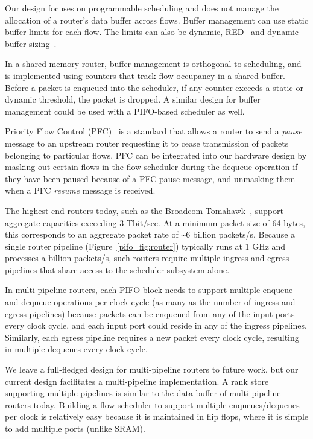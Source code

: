 Our design focuses on programmable scheduling and does not manage the
allocation of a router's data buffer across flows.  Buffer management can use
static buffer limits for each flow. The limits can also be dynamic, \eg
RED~\cite{red} and dynamic buffer sizing~\cite{broadcom_dynamic}.

In a shared-memory router, buffer management is orthogonal to scheduling,
and is implemented using counters that track flow occupancy in a shared
buffer. Before a packet is enqueued into the scheduler, if any counter
 exceeds a static or dynamic threshold, the packet is dropped. A similar
design for buffer management could be used with a PIFO-based scheduler as well.

Priority Flow Control (PFC)~\cite{pfc} is a standard that allows a router to
send a {\em pause} message to an upstream router requesting it to cease
transmission of packets belonging to particular flows. PFC can be integrated
into our hardware design by masking out certain flows in the flow scheduler
during the dequeue operation if they have been paused because of a PFC pause
message, and unmasking them when a PFC {\em resume} message is received.

The highest end routers today, such as the Broadcom Tomahawk~\cite{tomahawk},
support aggregate capacities exceeding 3 Tbit/sec. At a minimum packet size of
64 bytes, this corresponds to an aggregate packet rate of \textasciitilde6
billion packets/s. Because a single router pipeline
(Figure~\ref{pifo_fig:router}) typically runs at 1 GHz and processes a
billion packets/s, such routers require multiple ingress and egress pipelines
that share access to the scheduler subsystem alone.

In multi-pipeline routers, each PIFO block needs to support multiple enqueue
and dequeue operations per clock cycle (as many as the number of ingress and
egress pipelines) because packets can be enqueued from any of the input ports
every clock cycle, and each input port could reside in any of the ingress
pipelines. Similarly, each egress pipeline requires a new packet every clock
cycle, resulting in multiple dequeues every clock cycle.

We leave a full-fledged design for multi-pipeline routers to future work, but our
current design facilitates a multi-pipeline implementation. A rank store
supporting multiple pipelines is similar to the data buffer of multi-pipeline
routers today. Building a flow scheduler to support multiple enqueues/dequeues
per clock is relatively easy because it is maintained in flip flops, where it
is simple to add multiple ports (unlike SRAM).
